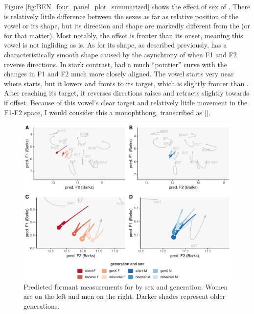 Figure \ref{fig:BEN_four_panel_plot_summarized} shows the effect of sex of \ben. There is relatively little difference between the sexes as far as relative position of the vowel or its shape, but its direction and shape are markedly different from the \ban (or \bin for that matter). Most notably, the offset is fronter than its onset, meaning this vowel is not ingliding as \bet is. As for its shape, as described previously, \ban has a characteristically smooth shape caused by the asynchrony of when F1 and F2 reverse directions. In stark contrast, \ben had a much ``pointier'' curve with the changes in F1 and F2 much more closely aligned. The vowel starts very near where \bet starts, but it lowers and fronts to its target, which is slightly fronter than \bet. After reaching its target, it reverses directions raises and retracts slightly towards if offset. Because of this vowel's clear target and relatively little movement in the F1-F2 space, I would consider this a monophthong, transcribed as [].

\begin{figure}[tb!]
	\centering
	\includegraphics[width = 6.5in]{Figures/BEN/BEN_four_panel_plot.pdf}
	\caption[Predicted formant measurements for \ben by sex and generation.]{Predicted formant measurements for \ben by sex and generation. Women are on the left and men on the right. Darker shades represent older generations.}
	\label{fig:BEN_four_panel}
\end{figure}

